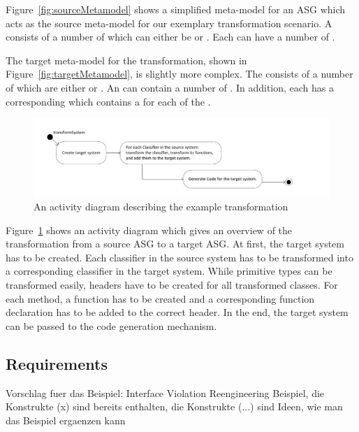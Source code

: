 Figure~\ref{fig:sourceMetamodel} shows a simplified meta-model for an ASG which acts as the source meta-model for our exemplary transformation scenario. A  consists of a number of  which can either be  or . Each  can have a number of .

The target meta-model for the transformation, shown in Figure~\ref{fig:targetMetamodel}, is slightly more complex.
The  consists of a number of  which are either  or .
An  can contain a number of . In addition, each  has a corresponding  which contains a  for each  of the .


\begin{figure}[htbp]
\begin{center}
  \includegraphics[width=\textwidth]{figures/transformationOverview}
  \caption{An activity diagram describing the example transformation}
  \label{fig:transformationOverview}
\end{center}
\end{figure}

Figure~\ref{fig:transformationOverview} shows an activity diagram which gives an overview of the transformation from a source ASG to a target ASG.
At first, the target system has to be created. Each classifier in the source system has to be transformed into a corresponding classifier in the target system. While primitive types can be transformed easily, headers have to be created for all transformed classes. For each method, a function has to be created and a corresponding function declaration has to be added to the correct header. In the end, the target system can be passed to the code generation mechanism.

\subsection{Requirements}

Vorschlag fuer das Beispiel: Interface Violation Reengineering Beispiel, die Konstrukte (x) sind bereits enthalten, die Konstrukte (...) sind Ideen, wie man das Beispiel ergaenzen kann

